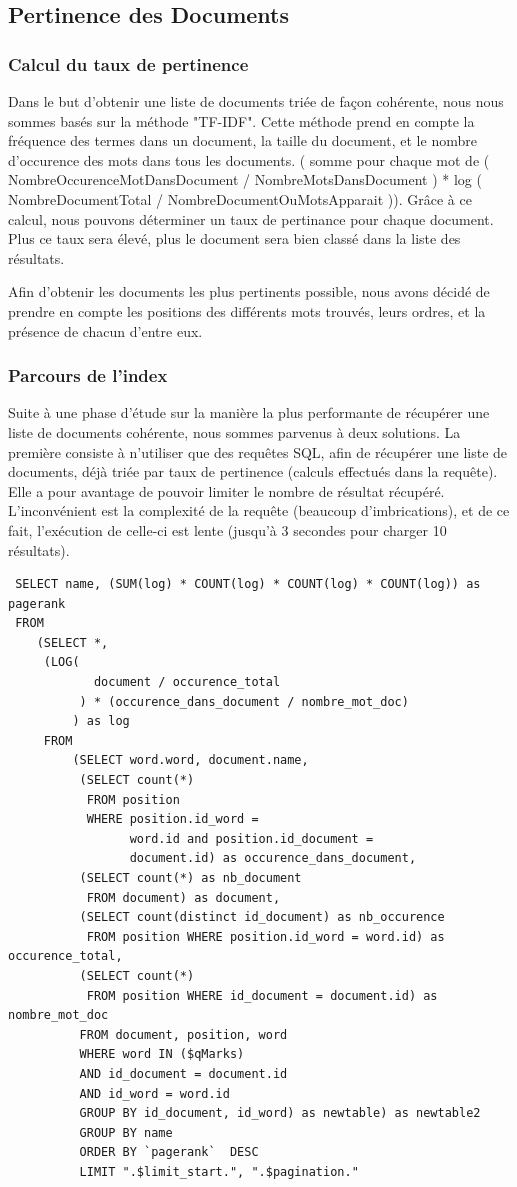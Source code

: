 \documentclass[11pt,a4paper]{article}
\begin{document}
\subsection{Pertinence des Documents}
\subsubsection{Calcul du taux de pertinence}
Dans le but d'obtenir une liste de documents triée de façon cohérente, nous nous sommes basés sur la méthode "TF-IDF".
Cette méthode prend en compte la fréquence des termes dans un document, la taille du document, et le nombre d'occurence des mots dans tous les documents. ( somme pour chaque mot de ( NombreOccurenceMotDansDocument / NombreMotsDansDocument ) * log ( NombreDocumentTotal / NombreDocumentOuMotsApparait )). Grâce à ce calcul, nous pouvons déterminer un taux de pertinance pour chaque document. Plus ce taux sera élevé, plus le document sera bien classé dans la liste des résultats.

Afin d'obtenir les documents les plus pertinents possible, nous avons décidé de prendre en compte les positions des différents mots trouvés, leurs ordres, et la présence de chacun d'entre eux.

\subsubsection{Parcours de l'index}

Suite à une phase d'étude sur la manière la plus performante de récupérer une liste de documents cohérente, nous sommes parvenus à deux solutions.
La première consiste à n'utiliser que des requêtes SQL, afin de récupérer une liste de documents, déjà triée par taux de pertinence (calculs effectués dans la requête). Elle a pour avantage de pouvoir limiter le nombre de résultat récupéré. L'inconvénient est la complexité de la requête (beaucoup d'imbrications), et de ce fait, l'exécution de celle-ci est lente (jusqu'à 3 secondes pour charger 10 résultats).
\begin{lstlisting}
 SELECT name, (SUM(log) * COUNT(log) * COUNT(log) * COUNT(log)) as pagerank
 FROM
	(SELECT *,
	 (LOG(
	 		document / occurence_total
	 	  ) * (occurence_dans_document / nombre_mot_doc)
	 	 ) as log
     FROM
         (SELECT word.word, document.name,
          (SELECT count(*)
           FROM position 
           WHERE position.id_word = 
           		 word.id and position.id_document = 
           		 document.id) as occurence_dans_document,
          (SELECT count(*) as nb_document
           FROM document) as document,
          (SELECT count(distinct id_document) as nb_occurence
           FROM position WHERE position.id_word = word.id) as occurence_total,
          (SELECT count(*)
           FROM position WHERE id_document = document.id) as nombre_mot_doc
          FROM document, position, word
          WHERE word IN ($qMarks)
          AND id_document = document.id
          AND id_word = word.id
          GROUP BY id_document, id_word) as newtable) as newtable2
          GROUP BY name
          ORDER BY `pagerank`  DESC
          LIMIT ".$limit_start.", ".$pagination."
\end{lstlisting}
\end{document}
